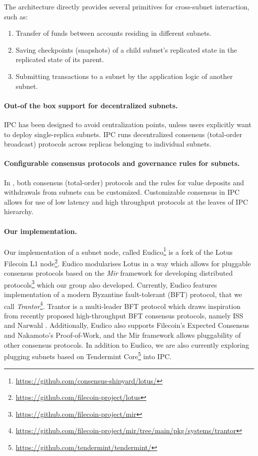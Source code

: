 The \ipc architecture directly provides several primitives for cross-subnet interaction, such as:
\begin{enumerate}
    \item Transfer of funds between accounts residing in different subnets.
    \item Saving checkpoints (snapshots) of a child subnet's replicated state in the replicated state of its parent.
    \item Submitting transactions to a subnet by the application logic of another subnet.
\end{enumerate}

\paragraph{Out-of the box support for decentralized subnets.} IPC has been designed to avoid centralization points, unless users explicitly want to deploy single-replica subnets. IPC runs decentralized consensus (total-order broadcast) protocols across replicas belonging to individual subnets.

\paragraph{Configurable consensus protocols and governance rules for subnets.} In \ipc, both consensus (total-order) protocols and the rules for value deposits and withdrawals from subnets can be customized. Customizable consensus in IPC allows for use of low latency and high throughput protocols at the leaves of IPC hierarchy.

\paragraph{Our implementation.}
Our implementation of a subnet node, called Eudico\footnote{\url{https://github.com/consensus-shipyard/lotus/}} is a fork of  the Lotus Filecoin L1 node\footnote{\url{https://github.com/filecoin-project/lotus}}. Eudico modularises Lotus in a way which allows for pluggable consensus protocols based on the \emph{Mir} framework for developing distributed protocols\footnote{\url{https://github.com/filecoin-project/mir}} which our group also developed. Currently, Eudico features implementation of a modern Byzantine fault-tolerant (BFT) protocol, that we call \emph{Trantor}\footnote{\url{https://github.com/filecoin-project/mir/tree/main/pkg/systems/trantor}}. Trantor is a multi-leader BFT protocol which draws inspiration from recently proposed high-throughput BFT consensus protocols, namely ISS \cite{ISS} and Narwahl \cite{Narwahl}. Additionally, Eudico also supports Filecoin's Expected Consensus and Nakamoto's Proof-of-Work, and the Mir framework allows pluggability of other consensus protocols. In addition to Eudico, we are also currently exploring plugging subnets based on Tendermint Core\footnote{\url{https://github.com/tendermint/tendermint/}} into IPC. 





